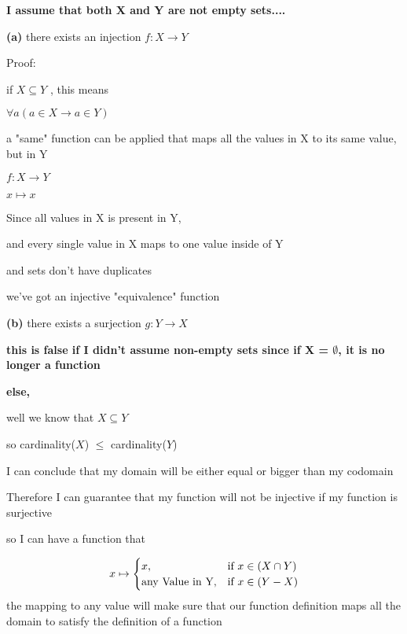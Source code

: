\documentclass[12pts,A4]{article}
\begin{document}
\begin{flushleft}
    
    \textbf{I assume that both X and Y are not empty sets....}


    \textbf{(a)} there exists an injection $f : X \rightarrow Y$
    \bigskip

    Proof:

    if $ X \subseteq Y$ , this means 
    
    $ \forall a ( a \in X \rightarrow a \in Y) $

    a "same" function can be applied that maps all the values in X to its same value, but in Y

    \bigskip
     $f : X \rightarrow Y$
    
     $ x \mapsto x$ 
    
    \bigskip

    Since all values in X is present in Y,
    
    and every single value in X maps to one value inside of Y
   
    and sets don't have duplicates

    we've got an injective "equivalence" function

    \bigskip
    \bigskip

    

    \textbf{(b)} there exists a surjection $g : Y \rightarrow X$

    \textbf{this is false if I didn't assume non-empty sets since if X = $\emptyset$, it is no longer a function}

    \bigskip

    \bigskip
    \textbf{else,}

    well we know that $X \subseteq Y$

    so cardinality($X$) $\leq$ cardinality($Y$)
    
    I can conclude that my domain will be either equal or bigger than my codomain

    Therefore I can guarantee that my function will not be injective if my function is surjective
    \bigskip

    so  I can have a  function that 


    \begin{equation}
        x \mapsto \begin{cases}
            x,& \text{if $ x \in (X \cap Y)$}\\
            \text{any Value in Y}, & \text{if } x \in (Y - X)
        \end{cases}
    \end{equation}
   \bigskip 
    the mapping to any value will make sure that our function definition maps all the domain to satisfy the definition of a function

\end{flushleft}
\end{document}
